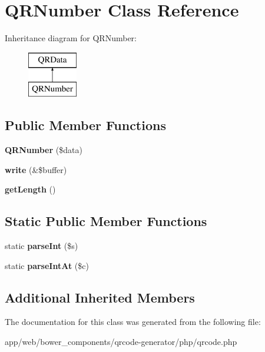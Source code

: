 \hypertarget{class_q_r_number}{}\section{Q\+R\+Number Class Reference}
\label{class_q_r_number}
Inheritance diagram for Q\+R\+Number\+:\begin{figure}[H]
\begin{center}
\leavevmode
\includegraphics[height=2.000000cm]{class_q_r_number}
\end{center}
\end{figure}
\subsection*{Public Member Functions}
\begin{DoxyCompactItemize}
\item 
\mbox{\label{class_q_r_number_aa4cbceac5f9e04576c131e6a0542859d}} 
{\bfseries Q\+R\+Number} (\$data)
\item 
\mbox{\label{class_q_r_number_a1ca4e68bd2b038935331206ceb78b04c}} 
{\bfseries write} (\&\$buffer)
\item 
\mbox{\label{class_q_r_number_a5e58428b897f4214000cc06f88fccaac}} 
{\bfseries get\+Length} ()
\end{DoxyCompactItemize}
\subsection*{Static Public Member Functions}
\begin{DoxyCompactItemize}
\item 
\mbox{\label{class_q_r_number_acc0ba8c17284646029dac5754e3893fb}} 
static {\bfseries parse\+Int} (\$s)
\item 
\mbox{\label{class_q_r_number_ad06267601944a2bc2c7d8efc3a24b7de}} 
static {\bfseries parse\+Int\+At} (\$c)
\end{DoxyCompactItemize}
\subsection*{Additional Inherited Members}


The documentation for this class was generated from the following file\+:\begin{DoxyCompactItemize}
\item 
app/web/bower\+\_\+components/qrcode-\/generator/php/qrcode.\+php\end{DoxyCompactItemize}
